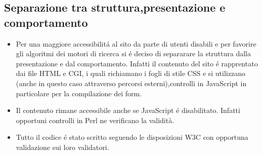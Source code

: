 \documentclass[12pt]{article}
\begin{document}
		\subsection{Separazione tra struttura,presentazione e comportamento}
		\begin{itemize}
			\item Per una maggiore accessibilit\'a al sito da parte di utenti disabili e per favorire gli algoritmi dei motori di ricerca si \'e deciso di separarare la struttura dalla presentazione e dal comportamento.
			Infatti il contenuto del sito \'e rapprentato dai file HTML e CGI, i quali richiamano i fogli di stile CSS e si utilizzano (anche in questo caso attraverso percorsi esterni),controlli in JavaScript in particolare per la compilazione dei form. 

			\item Il contenuto rimane accessibile anche se JavaScript \'e disabilitato. Infatti opportuni controlli in Perl ne verificano la validit\`a.

			\item Tutto il codice \'e stato scritto seguendo le disposizioni W3C con opportuna validazione sui loro validatori.
		\end{itemize}
\end{document}

